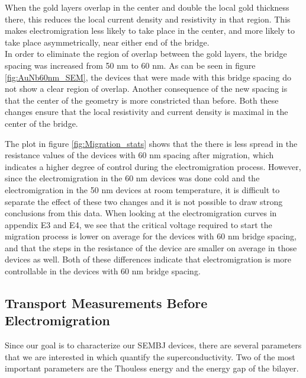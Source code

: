 When the gold layers overlap in the center and double the local gold thickness there, this reduces the local current density and resistivity in that region. This makes electromigration less likely to take place in the center, and more likely to take place asymmetrically, near either end of the bridge.\\


In order to eliminate the region of overlap between the gold layers, the bridge spacing was increased from 50 nm to 60 nm. As can be seen in figure \ref{fig:AuNb60nm_SEM}, the devices that were made with this bridge spacing do not show a clear region of overlap. Another consequence of the new spacing is that the center of the geometry is more constricted than before. Both these changes ensure that the local resistivity and current density is maximal in the center of the bridge. 

The plot in figure \ref{fig:Migration_stats} shows that the there is less spread in the resistance values of the devices with 60 nm spacing after migration, which indicates a higher degree of control during the electromigration process. However, since the electromigration in the 60 nm devices was done cold and the electromigration in the 50 nm devices at room temperature, it is difficult to separate the effect of these two changes and it is not possible to draw strong conclusions from this data. When looking at the electromigration curves in appendix E3 and E4, we see that the critical voltage required to start the migration process is lower on average for the devices with 60 nm bridge spacing, and that the steps in the resistance of the device are smaller on average in those devices as well. Both of these differences indicate that electromigration is more controllable in the devices with 60 nm bridge spacing. 


\subsection{Transport Measurements Before Electromigration}

Since our goal is to characterize our SEMBJ devices, there are several parameters that we are interested in which quantify the superconductivity. Two of the most important parameters are the Thouless energy and the energy gap of the bilayer.


